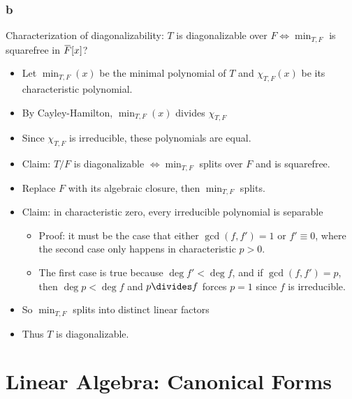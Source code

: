 \begin{solution}
\hypertarget{b-96}{%
\subsubsection{b}\label{b-96}}

Characterization of diagonalizability: \(T\) is diagonalizable over
\(F \iff \min_{T, F}\) is squarefree in
\(\mkern 1.5mu\overline{\mkern-1.5muF\mkern-1.5mu}\mkern 1.5mu[x]\)?

\begin{itemize}
\tightlist
\item
  Let \(\min_{T, F}(x)\) be the minimal polynomial of \(T\) and
  \(\chi_{T, F}(x)\) be its characteristic polynomial.
\item
  By Cayley-Hamilton, \(\min_{T, F}(x)\) divides \(\chi_{T, F}\)
\item
  Since \(\chi_{T, F}\) is irreducible, these polynomials are equal.
\item
  Claim: \(T/F\) is diagonalizable \(\iff \min_{T, F}\) splits over
  \(F\) and is squarefree.
\item
  Replace \(F\) with its algebraic closure, then \(\min_{T, F}\) splits.
\item
  Claim: in characteristic zero, every irreducible polynomial is
  separable

  \begin{itemize}
  \tightlist
  \item
    Proof: it must be the case that either \(\gcd(f, f') = 1\) or
    \(f' \equiv 0\), where the second case only happens in
    characteristic \(p>0\).
  \item
    The first case is true because \(\deg f' < \deg f\), and if
    \(\gcd(f, f') = p\), then \(\deg p < \deg f\) and \(p\divides f\)
    forces \(p=1\) since \(f\) is irreducible.
  \end{itemize}
\item
  So \(\min_{T, F}\) splits into distinct linear factors
\item
  Thus \(T\) is diagonalizable.
\end{itemize}

\end{solution}

\hypertarget{linear-algebra-canonical-forms}{%
\section{Linear Algebra: Canonical
Forms}\label{linear-algebra-canonical-forms}}

